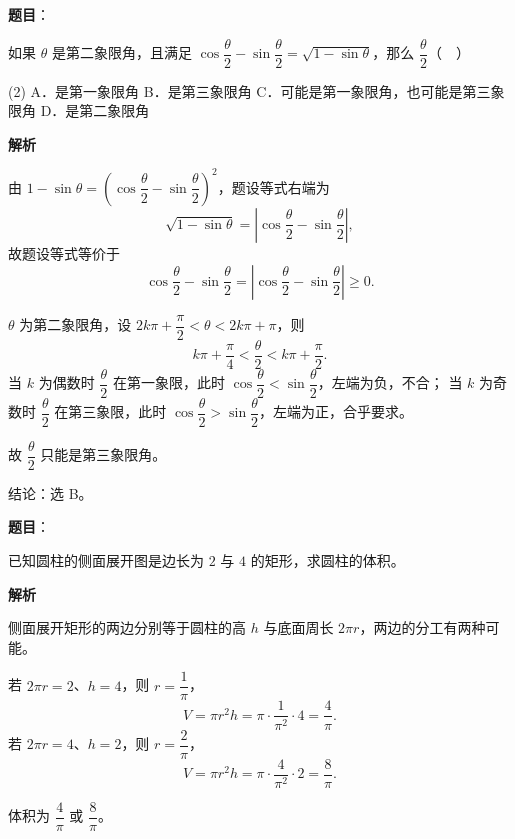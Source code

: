 \begin{answer}

\textbf{题目}：

如果 $\theta$ 是第二象限角，且满足 $\cos\dfrac\theta2-\sin\dfrac\theta2=\sqrt{1-\sin\theta}$，那么 $\dfrac\theta2$（　）

\begin{gkopts}(2)
\task A．是第一象限角
\task B．是第三象限角
\task C．可能是第一象限角，也可能是第三象限角
\task D．是第二象限角
\end{gkopts}

\textbf{解析}

由 $1-\sin\theta=\left(\cos\dfrac\theta2-\sin\dfrac\theta2\right)^2$，题设等式右端为
\nopagebreak[4]
\[
\sqrt{1-\sin\theta}=\left|\cos\frac\theta2-\sin\frac\theta2\right|,
\]
故题设等式等价于
\nopagebreak[4]
\[
\cos\frac\theta2-\sin\frac\theta2=\left|\cos\frac\theta2-\sin\frac\theta2\right|\ge0.
\]

$\theta$ 为第二象限角，设 $2k\pi+\dfrac\pi2<\theta<2k\pi+\pi$，则
\nopagebreak[4]
\[
k\pi+\frac\pi4<\frac\theta2<k\pi+\frac\pi2.
\]
当 $k$ 为偶数时 $\dfrac\theta2$ 在第一象限，此时 $\cos\dfrac\theta2<\sin\dfrac\theta2$，左端为负，不合；
当 $k$ 为奇数时 $\dfrac\theta2$ 在第三象限，此时 $\cos\dfrac\theta2>\sin\dfrac\theta2$，左端为正，合乎要求。

故 $\dfrac\theta2$ 只能是第三象限角。

结论：选 B。


\end{answer}
\begin{answer}

\textbf{题目}：

已知圆柱的侧面展开图是边长为 $2$ 与 $4$ 的矩形，求圆柱的体积。

\textbf{解析}

侧面展开矩形的两边分别等于圆柱的高 $h$ 与底面周长 $2\pi r$，两边的分工有两种可能。

若 $2\pi r=2$、$h=4$，则 $r=\dfrac1\pi$，
\nopagebreak[4]
\[
V=\pi r^2h=\pi\cdot\frac1{\pi^2}\cdot4=\frac4\pi.
\]
若 $2\pi r=4$、$h=2$，则 $r=\dfrac2\pi$，
\nopagebreak[4]
\[
V=\pi r^2h=\pi\cdot\frac4{\pi^2}\cdot2=\frac8\pi.
\]

体积为 $\dfrac4\pi$ 或 $\dfrac8\pi$。


\end{answer}
